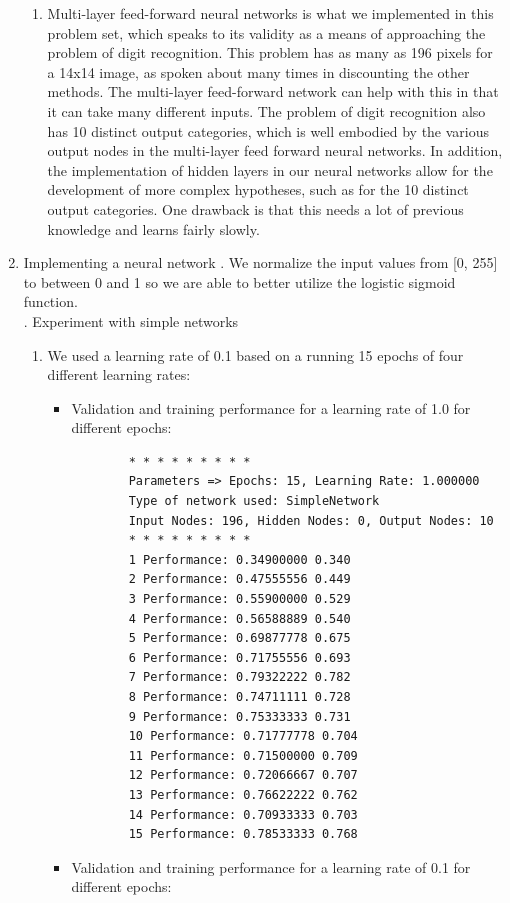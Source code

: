 \documentclass[11pt]{article}
\begin{document}
\begin{enumerate}
\begin{enumerate}
	\item Multi-layer feed-forward neural networks is what we implemented in this problem set, which speaks to its validity as a means of approaching the problem of digit recognition. This problem has as many as 196 pixels for a 14x14 image, as spoken about many times in discounting the other methods. The multi-layer feed-forward network can help with this in that it can take many different inputs. The problem of digit recognition also has 10 distinct output categories, which is well embodied by the various output nodes in the multi-layer feed forward neural networks. In addition, the implementation of hidden layers in our neural networks allow for the development of more complex hypotheses, such as for the 10 distinct output categories. One drawback is that this needs a lot of previous knowledge and learns fairly slowly.
	\end{enumerate}
\item Implementing a neural network
\newline
{}. We normalize the input values from [0, 255] to between 0 and 1 so we are able to better utilize the logistic sigmoid function.\\ 
. Experiment with simple networks
\begin{enumerate}
\item We used a learning rate of 0.1 based on a running 15 epochs of four different learning rates:
	\begin{itemize}
	\item Validation and training performance for a learning rate of 1.0 for different epochs:
		\begin{verbatim}
		* * * * * * * * *
		Parameters => Epochs: 15, Learning Rate: 1.000000
		Type of network used: SimpleNetwork
		Input Nodes: 196, Hidden Nodes: 0, Output Nodes: 10
		* * * * * * * * *
		1 Performance: 0.34900000 0.340
		2 Performance: 0.47555556 0.449
		3 Performance: 0.55900000 0.529
		4 Performance: 0.56588889 0.540
		5 Performance: 0.69877778 0.675
		6 Performance: 0.71755556 0.693
		7 Performance: 0.79322222 0.782
		8 Performance: 0.74711111 0.728
		9 Performance: 0.75333333 0.731
		10 Performance: 0.71777778 0.704
		11 Performance: 0.71500000 0.709
		12 Performance: 0.72066667 0.707
		13 Performance: 0.76622222 0.762
		14 Performance: 0.70933333 0.703
		15 Performance: 0.78533333 0.768
		\end{verbatim}
	\item Validation and training performance for a learning rate of 0.1 for different epochs:

\end{itemize}
\end{enumerate}
\end{enumerate}
\end{document}
